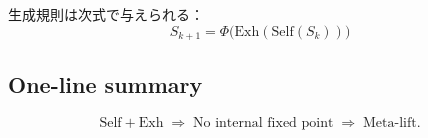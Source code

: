 \documentclass[uplatex,dvipdfmx,12pt,a4paper]{jsarticle}
\begin{document}
生成規則は次式で与えられる：
\begin{equation}
  \boxed{\;S_{k+1} = \Phi\!\bigl(\mathrm{Exh}(\mathrm{Self}(S_k))\bigr)\;}
\end{equation}

\subsection{One-line summary}
\begin{equation}
  \boxed{\;\mathrm{Self}+\mathrm{Exh}\;\Rightarrow\;\text{No internal fixed point}\;\Rightarrow\;\text{Meta-lift}.\;}
\end{equation}
\end{document}
